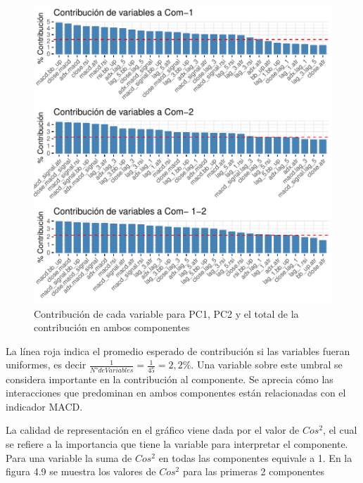 \documentclass[a4paper,12pt]{Latex/Classes/PhDthesisPSnPDF}
\begin{document}
\begin{figure}[H]
\centering
\includegraphics{main-014}
\caption{Contribución de cada variable para PC1, PC2 y el total de la contribución en ambos componentes}
\end{figure}

La línea roja indica el promedio esperado de contribución si las variables fueran uniformes, es decir $ \frac{1}{N° de Variables} = \frac{1}{45} = 2,2\%$. Una variable sobre este umbral se considera importante en la contribución al componente. Se aprecia cómo las interacciones que predominan en ambos componentes están relacionadas con el indicador MACD.

La calidad de representación en el gráfico viene dada por el valor de $Cos^2$, el cual se refiere a la importancia que tiene la variable para interpretar el componente. Para una variable la suma de $Cos^2$ en todas las componentes equivale a 1. En la figura 4.9 se muestra los valores de $Cos^2$ para las primeras 2 componentes
\end{document}
